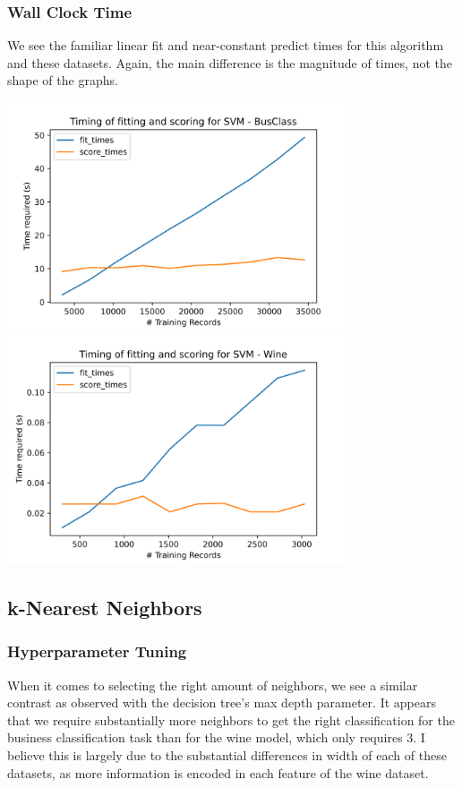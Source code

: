 \documentclass[
	letterpaper, %
]{jdf}
\begin{document}
\subsubsection{Wall Clock Time}
We see the familiar linear fit and near-constant predict times for this algorithm and these datasets. Again, the main difference is the magnitude of times, not the shape of the graphs.

\includegraphics[width=4in]{Figures/BusClass-0920/SVM/time_curve.png}
\includegraphics[width=4in]{Figures/Wine-0921/SVM/time_curve.png}


\subsection{k-Nearest Neighbors}

\subsubsection{Hyperparameter Tuning}

When it comes to selecting the right amount of neighbors, we see a similar contrast as observed with the decision tree's max depth parameter. It appears that we require substantially more neighbors to get the right classification for the business classification task than for the wine model, which only requires 3. I believe this is largely due to the substantial differences in width of each of these datasets, as more information is encoded in each feature of the wine dataset.
\end{document}
